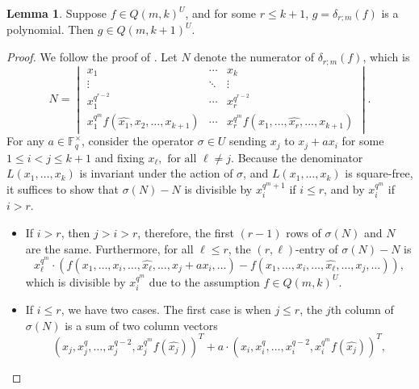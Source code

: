 \documentclass[12pt,a4paper]{report}
\theoremstyle{definition}
\newtheorem{lemma}[theorem]{Lemma}
\theoremstyle{remark}
\theoremstyle{definition}
\begin{document}
\begin{lemma}\label{lemma:U_induction}
    Suppose $f\in Q(m, k)^U$, and for some $r\leq k+1$, $g=\delta_{r;m}(f)$ is a polynomial. Then $g\in Q(m, k+1)^U$.
\end{lemma}
\begin{proof}
    We follow the proof of \cite[Proposition 4.3]{Ha_Hai_Nghia_2024}. Let $N$ denote the numerator of $\delta_{r;m}(f)$, which is
    \begin{equation*}
        N = \begin{vmatrix}
            x_1 & \cdots & x_k\\
            \vdots & \ddots & \vdots\\
            x_1^{q^{r-2}} & \cdots & x_r^{q^{r-2}}\\
            x_1^{q^m}f(\widehat{x_1}, x_2, \ldots, x_{k+1}) & \cdots  & x_r^{q^m}f(x_1, \ldots, \widehat{x_r}, \ldots, x_{k+1})
        \end{vmatrix}.
    \end{equation*}
    For any $a\in \mathbb{F}_q^{\times}$, consider the operator $\sigma\in U$ sending $x_j$ to $x_j + ax_i$ for some $1\leq i<j\leq k+1$ and fixing $x_{\ell}, \text{ for all } \ell\neq j$. Because the denominator $L(x_1, \ldots, x_k)$ is invariant under the action of $\sigma$, and $L(x_1, \ldots, x_k)$ is square-free, it suffices to show that $\sigma(N) - N$ is divisible by $x_i^{q^{m}+1}$ if $i\leq r$, and by $x_i^{q^m}$ if $i>r$.
    \begin{itemize}
        \item[(1)] If $i>r$, then $j>i>r$, therefore, the first $(r-1)$ rows of $\sigma(N)$ and $N$ are the same. Furthermore, for all $\ell\leq r$, the $(r, \ell)$-entry of $\sigma(N)-N$ is 
        \begin{equation*}
            x_{\ell}^{q^m}\cdot (f(x_1, \ldots,x_i,\ldots, \widehat{x_{\ell}},\ldots, x_j+ax_i, \ldots)-f(x_1, \ldots,x_i,\ldots, \widehat{x_{\ell}},\ldots, x_j, \ldots)),
        \end{equation*}
        which is divisible by $x_i^{q^m}$ due to the assumption $f\in Q(m, k)^U$.
        \item[(2)] If $i\leq r$, we have two cases. The first case is when $j\leq r$, the $j$th column of $\sigma(N)$ is a sum of two column vectors
            \begin{equation*}
                (x_j, x_j^q, \ldots, x_j^{q-2}, x_j^{q^m}f(\widehat{x_j}))^T + a\cdot (x_i, x_i^q, \ldots, x_i^{q-2}, x_i^{q^m}f(\widehat{x_j}))^T,
            \end{equation*}

\end{itemize}
\end{proof}
\end{document}
